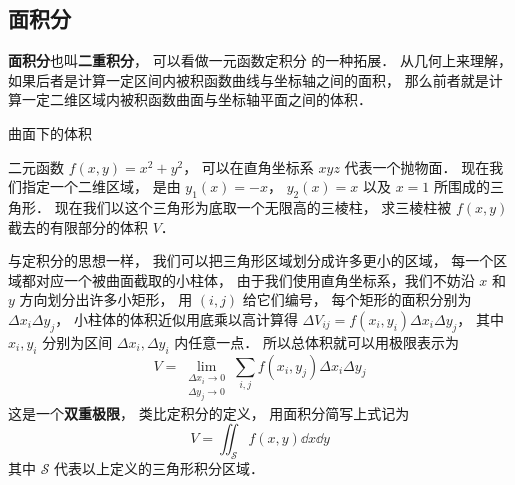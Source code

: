 
\subsection{面积分}
\textbf{面积分}也叫\textbf{二重积分}， 可以看做一元函数定积分 的一种拓展． 从几何上来理解， 如果后者是计算一定区间内被积函数曲线与坐标轴之间的面积， 那么前者就是计算一定二维区域内被积函数曲面与坐标轴平面之间的体积．

\begin{example}{曲面下的体积}\label{IntN_ex1}

二元函数 $f(x,y) = x^2 + y^2$， 可以在直角坐标系 $xyz$ 代表一个抛物面． 现在我们指定一个二维区域， 是由 $y_1(x) = -x$， $y_2(x) = x$ 以及 $x = 1$ 所围成的三角形． 现在我们以这个三角形为底取一个无限高的三棱柱， 求三棱柱被 $f(x,y)$ 截去的有限部分的体积 $V$．

与定积分的思想一样， 我们可以把三角形区域划分成许多更小的区域， 每一个区域都对应一个被曲面截取的小柱体， 由于我们使用直角坐标系，我们不妨沿 $x$ 和 $y$ 方向划分出许多小矩形， 用 $(i,j)$ 给它们编号， 每个矩形的面积分别为 $\Delta x_i \Delta y_j$， 小柱体的体积近似用底乘以高计算得 $\Delta V_{ij} = f(x_i,y_i) \Delta x_i \Delta y_j$， 其中 $x_i, y_i$ 分别为区间 $\Delta x_i, \Delta y_i$ 内任意一点． 所以总体积就可以用极限表示为
\begin{equation}\label{IntN_eq1}
V = \lim_{\substack{\Delta x_i\to 0\\ \Delta y_j\to 0}} \sum_{i, j} f(x_i,y_j) \Delta x_i \Delta y_j
\end{equation}
这是一个\textbf{双重极限}， 类比定积分的定义， 用面积分简写上式记为
\begin{equation}
V = \iint_{\mathcal{S}} f(x,y) \dd{x}\dd{y}
\end{equation}
其中 $\mathcal{S}$ 代表以上定义的三角形积分区域． 


\end{example}
